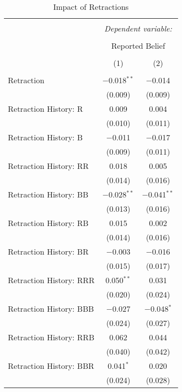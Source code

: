 
\begin{table}[!htbp] \centering \footnotesize
  \caption{Impact of Retractions} 
  \label{tab:retraction_compressed_histories} 
\begin{tabular}{@{\extracolsep{5pt}}lcc} 
\\[-1.8ex]\hline 
\hline \\[-1.8ex] 
 & \multicolumn{2}{c}{\textit{Dependent variable:}} \\ 
\cline{2-3} 
\\[-1.8ex] & \multicolumn{2}{c}{Reported Belief} \\ 
\\[-1.8ex] & (1) & (2)\\ 
\hline \\[-1.8ex] 
 Retraction & $-$0.018$^{**}$ & $-$0.014 \\ 
  & (0.009) & (0.009) \\ 
  Retraction History: R & 0.009 & 0.004 \\ 
  & (0.010) & (0.011) \\ 
  Retraction History: B & $-$0.011 & $-$0.017 \\ 
  & (0.009) & (0.011) \\ 
  Retraction History: RR & 0.018 & 0.005 \\ 
  & (0.014) & (0.016) \\ 
  Retraction History: BB & $-$0.028$^{**}$ & $-$0.041$^{**}$ \\ 
  & (0.013) & (0.016) \\ 
  Retraction History: RB & 0.015 & 0.002 \\ 
  & (0.014) & (0.016) \\ 
  Retraction History: BR & $-$0.003 & $-$0.016 \\ 
  & (0.015) & (0.017) \\ 
  Retraction History: RRR & 0.050$^{**}$ & 0.031 \\ 
  & (0.020) & (0.024) \\ 
  Retraction History: BBB & $-$0.027 & $-$0.048$^{*}$ \\ 
  & (0.024) & (0.027) \\ 
  Retraction History: RRB & 0.062 & 0.044 \\ 
  & (0.040) & (0.042) \\ 
  Retraction History: BBR & 0.041$^{*}$ & 0.020 \\ 
  & (0.024) & (0.028) \\ 

\end{tabular}
\end{table}
